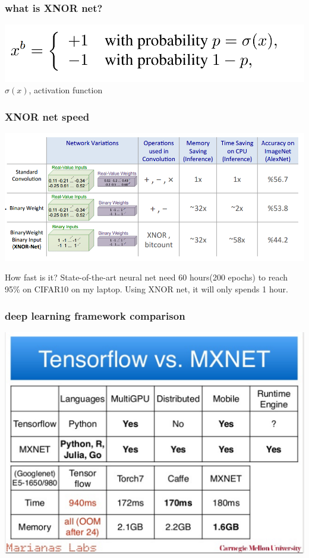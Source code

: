 \documentclass{beamer}
\begin{document}
\begin{frame}
\frametitle{what is XNOR net?}
\includegraphics[width=\textwidth]{binary.png}\\
$\sigma(x)$, activation function
\end{frame}

\begin{frame}
\frametitle{XNOR net speed}
\includegraphics[width=\textwidth]{xnornet.png}\\
\begin{block}
{How fast is it?}
State-of-the-art neural net need 60 hours(200 epochs) to reach 95\% on CIFAR10 on my laptop. 
Using XNOR net, it will only spends 1 hour.
\end{block}
\end{frame}

\begin{frame}
\frametitle{deep learning framework comparison}
\includegraphics[width=.8\textwidth]{mxnet.png}
\end{frame}
\end{document}
